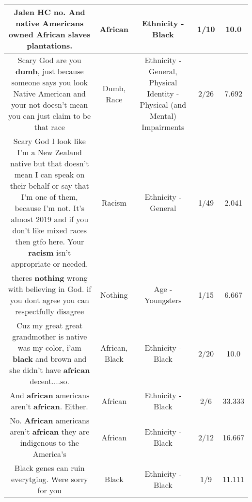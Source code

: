 \documentclass[11pt]{article}
\newlength\mylength
\begin{document}
\begin{center}
\begin{longtable}{|C{.65\mylength}|C{.30\mylength}|C{.12\mylength}|C{.12\mylength}|C{.12\mylength}|}
  \small Jalen HC no. And native Americans owned \textbf{African} slaves plantations.\normalsize   & African & Ethnicity - Black & 1/10 & 10.0 \\  \hline
  \small Scary God are you \textbf{dumb}, just because someone says you look Native American and your not doesn't mean you can just claim to be that race\normalsize   & Dumb, Race & Ethnicity - General, Physical Identity - Physical (and Mental) Impairments & 2/26 & 7.692 \\  \hline
  \small Scary God I look like I'm a New Zealand native but that doesn't mean I can speak on their behalf or say that I'm one of them, because I'm not. It's almost 2019 and if you don't like mixed races then gtfo here. Your \textbf{racism} isn't appropriate or needed.\normalsize   & Racism & Ethnicity - General & 1/49 & 2.041 \\  \hline
  \small theres \textbf{nothing} wrong with believing in God. if you dont agree you can respectfully disagree\normalsize   & Nothing & Age - Youngsters & 1/15 & 6.667 \\  \hline
  \small Cuz my great great grandmother is native was my color, i'am \textbf{black} and brown and she didn't have \textbf{african} decent....so.\normalsize   & African, Black & Ethnicity - Black & 2/20 & 10.0 \\  \hline
  \small And \textbf{african} americans aren't \textbf{african}. Either.\normalsize   & African & Ethnicity - Black & 2/6 & 33.333 \\  \hline
  \small {} No. \textbf{African} americans aren't \textbf{african} they are indigenous to the America's\normalsize   & African & Ethnicity - Black & 2/12 & 16.667 \\  \hline
  \small Black genes can ruin everytging. Were sorry for you\normalsize   & Black & Ethnicity - Black & 1/9 & 11.111 \\  \hline

\end{longtable}
\end{center}
\end{document}
